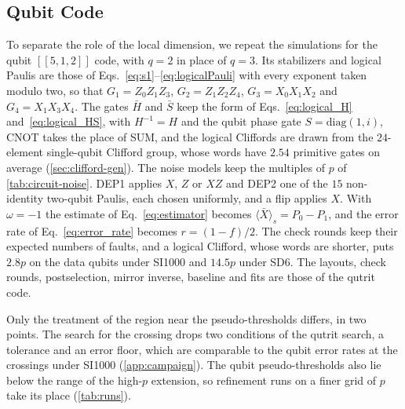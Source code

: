 \subsection{Qubit Code}
\label{sub:qubit_code}

To separate the role of the local dimension, we repeat the simulations for the qubit $[[5,1,2]]$ code, with $q = 2$ in place of $q = 3$. Its stabilizers and logical Paulis are those of Eqs.~\eqref{eq:s1}--\eqref{eq:logicalPauli} with every exponent taken modulo two, so that $G_1 = Z_0 Z_1 Z_3$, $G_2 = Z_1 Z_2 Z_4$, $G_3 = X_0 X_1 X_2$ and $G_4 = X_1 X_3 X_4$. The gates $\bar H$ and $\bar S$ keep the form of Eqs.~\eqref{eq:logical_H} and~\eqref{eq:logical_HS}, with $H^{-1} = H$ and the qubit phase gate $S = \mathrm{diag}(1, i)$, CNOT takes the place of SUM, and the logical Cliffords are drawn from the $24$-element single-qubit Clifford group, whose words have $2.54$ primitive gates on average (\autoref{sec:clifford-gen}). The noise models keep the multiples of $p$ of \autoref{tab:circuit-noise}. DEP1 applies $X$, $Z$ or $XZ$ and DEP2 one of the $15$ non-identity two-qubit Paulis, each chosen uniformly, and a flip applies $X$. With $\omega = -1$ the estimate of Eq.~\eqref{eq:estimator} becomes $\langle \bar{X} \rangle_s = P_0 - P_1$, and the error rate of Eq.~\eqref{eq:error_rate} becomes $r = (1 - f)/2$. The check rounds keep their expected numbers of faults, and a logical Clifford, whose words are shorter, puts $2.8p$ on the data qubits under SI1000 and $14.5p$ under SD6. The layouts, check rounds, postselection, mirror inverse, baseline and fits are those of the qutrit code.

Only the treatment of the region near the pseudo-thresholds differs, in two points. The search for the crossing drops two conditions of the qutrit search, a tolerance and an error floor, which are comparable to the qubit error rates at the crossings under SI1000 (\autoref{app:campaign}). The qubit pseudo-thresholds also lie below the range of the high-$p$ extension, so refinement runs on a finer grid of $p$ take its place (\autoref{tab:runs}).
